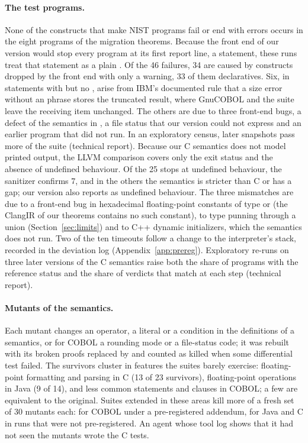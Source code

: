 \paragraph{The test programs.} None of the constructs that make NIST programs fail or end with errors occurs in the
eight programs of the migration theorems. Because the front end of our version would stop every program at its first
report line, a  statement, these runs treat that statement as a plain . Of the 46 failures, 34 are caused by constructs dropped by the front end with only a warning, 33 of them declaratives. Six, in statements with
 but no , arise from IBM's documented rule that a size error without an
 phrase stores the truncated result, where GnuCOBOL and the suite leave the receiving item unchanged.
The others are due to three front-end bugs, a defect of the semantics in , a file status that our version
could not express and an earlier program that did not run. In an exploratory census, later snapshots pass more of the suite (technical report).
Because our C semantics does not model printed output, the LLVM comparison covers only the exit status and the absence of undefined behaviour. Of the 25 stops at undefined behaviour, the sanitizer confirms 7, and in the others the semantics is
stricter than C or has a gap; our version also reports  as undefined behaviour. The three mismatches are due to a front-end bug in hexadecimal floating-point constants of type  or  (the ClangIR of
our theorems contains no such constant), to type punning through a union (Section~\ref{sec:limits}) and to C++ dynamic initializers, which the semantics does not run. Two of the ten timeouts follow a change to the interpreter's
stack, recorded in the deviation log (Appendix~\ref{app:prereg}). Exploratory re-runs on three later versions of the C semantics raise both the share of programs
with the reference status and the share of verdicts that match at each step (technical report).

\paragraph{Mutants of the semantics.} Each mutant changes an operator, a literal or a condition in the definitions of a
semantics, or for COBOL a rounding mode or a file-status code; it was rebuilt with its broken proofs replaced by
 and counted as killed when some differential test failed. The survivors cluster in features the suites
barely exercise: floating-point formatting and parsing in C (13 of 23 survivors), floating-point operations in Java (9
of 14), and less common statements and clauses in COBOL; a few are equivalent to the original. Suites extended in these
areas kill more of a fresh set of 30 mutants each: for COBOL under a pre-registered addendum, for Java and C in runs that
were not pre-registered. An agent whose tool log shows that it had not seen the mutants wrote the C tests.

